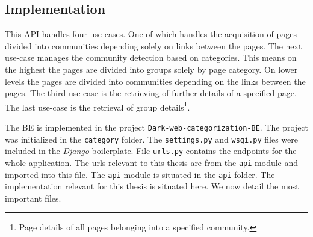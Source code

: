 \subsection{Implementation} \label{APIImplementation}
This API handles four use-cases. One of which handles the acquisition of pages divided into communities depending solely on links between the pages. The next use-case manages the community detection based on categories. This means on the highest the pages are divided into groups solely by page category. On lower levels the pages are divided into communities depending on the links between the pages. The third use-case is the retrieving of further details of a specified page. The last use-case is the retrieval of group details\footnote{Page details of all pages belonging into a specified community.}. 

The BE is implemented in the project \texttt{Dark-web-categorization-BE}. The project was initialized in the \texttt{category} folder. The \texttt{settings.py} and \texttt{wsgi.py} files were included in the \textit{Django} boilerplate. File \texttt{urls.py} contains the endpoints for the whole application. The urls relevant to this thesis are from the \texttt{api} module and imported into this file.
The \texttt{api} module is situated in the \texttt{api} folder. The implementation relevant for this thesis is situated here. We now detail the most important files. 

